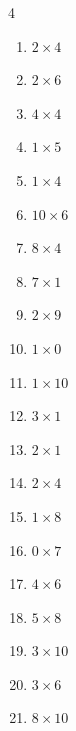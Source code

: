 \begin{multicols}{4}
\begin{enumerate}
  \item $2\times 4$
        \phantom{$=8$}

\columnbreak %

  \item $2\times 6$
        \phantom{$=12$}

  \item $4\times 4$
        \phantom{$=16$}

  \item $1\times 5$
        \phantom{$=5$}

  \item $1\times 4$
        \phantom{$=4$}

  \item $10\times 6$
        \phantom{$=60$}

  \item $8\times 4$
        \phantom{$=32$}

  \item $7\times 1$
        \phantom{$=7$}

  \item $2\times 9$
        \phantom{$=18$}

  \item $1\times 0$
        \phantom{$=0$}

  \item $1\times 10$
        \phantom{$=10$}

  \item $3\times 1$
        \phantom{$=3$}

  \item $2\times 1$
        \phantom{$=2$}

  \item $2\times 4$
        \phantom{$=8$}

  \item $1\times 8$
        \phantom{$=8$}

  \item $0\times 7$
        \phantom{$=0$}

  \item $4\times 6$
        \phantom{$=24$}

  \item $5\times 8$
        \phantom{$=40$}

  \item $3\times 10$
        \phantom{$=30$}

  \item $3\times 6$
        \phantom{$=18$}

  \item $8\times 10$
        \phantom{$=80$}


\end{enumerate}
\end{multicols}

